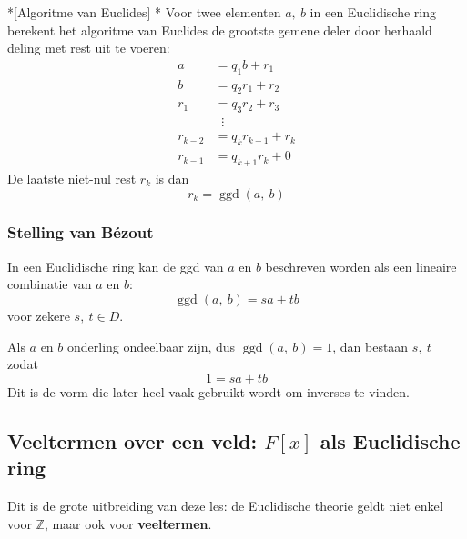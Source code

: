 \begin{nicealgorithm}*[Algoritme van Euclides]
    \nextpart[]*
    Voor twee elementen $a,\ b$ in een Euclidische ring berekent het algoritme van Euclides de grootste gemene deler door herhaald deling met rest uit te voeren:
    \begin{equation*}
        \begin{aligned}
            a   &= q_1b + r_1 \\
            b   &= q_2r_1 + r_2 \\
            r_1 &= q_3r_2 + r_3 \\
                &\;\; \vdots \\
            r_{k-2} &= q_kr_{k-1} + r_k \\
            r_{k-1} &= q_{k+1}r_k + 0
        \end{aligned}
    \end{equation*}
    De laatste niet-nul rest $r_k$ is dan
    \begin{equation*}
        r_k = \operatorname{ggd}(a,\ b)
    \end{equation*}
\end{nicealgorithm}

\subsubsection*{Stelling van Bézout}

In een Euclidische ring kan de ggd van $a$ en $b$ beschreven worden als een lineaire combinatie van $a$ en $b$:
\begin{equation*}
    \operatorname{ggd}(a,\ b) = sa + tb
\end{equation*}
voor zekere $s,\ t \in D$.

Als $a$ en $b$ onderling ondeelbaar zijn, dus $\operatorname{ggd}(a,\ b) = 1$, dan bestaan $s,\ t$ zodat
\begin{equation*}
    1 = sa + tb
\end{equation*}
Dit is de vorm die later heel vaak gebruikt wordt om inverses te vinden.

\subsection{Veeltermen over een veld: \texorpdfstring{$F[x]$}{F[x]} als Euclidische ring}

Dit is de grote uitbreiding van deze les: de Euclidische theorie geldt niet enkel voor $\mathbb{Z}$, maar ook voor \textbf{veeltermen}.

